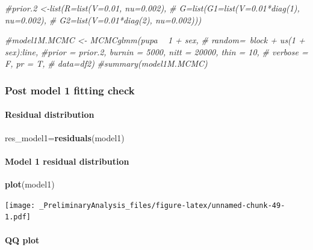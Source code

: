 \documentclass[
]{article}
\newenvironment{Shaded}{\begin{snugshade}}{\end{snugshade}}
\newcommand{\CommentTok}[1]{\textcolor[rgb]{0.56,0.35,0.01}{\textit{#1}}}
\newcommand{\KeywordTok}[1]{\textcolor[rgb]{0.13,0.29,0.53}{\textbf{#1}}}
\newcommand{\NormalTok}[1]{#1}
\begin{document}
\begin{Shaded}
\begin{Highlighting}[]
\CommentTok{#prior.2 <-list(R=list(V=0.01, nu=0.002), }
 \CommentTok{#              G=list(G1=list(V=0.01*diag(1), nu=0.002),}
  \CommentTok{#                    G2=list(V=0.01*diag(2), nu=0.002)))}

\CommentTok{#model1M.MCMC <- MCMCglmm(pupa ~ 1 + sex, }
 \CommentTok{# random=~block + us(1 + sex):line,}
  \CommentTok{#prior = prior.2, burnin = 5000, nitt = 20000, thin = 10,}
\CommentTok{# verbose = F, pr = T,}
 \CommentTok{# data=df2)}
\CommentTok{#summary(model1M.MCMC)}
\end{Highlighting}
\end{Shaded}

\hypertarget{post-model-1-fitting-check-2}{%
\subsubsection{Post model 1 fitting
check}\label{post-model-1-fitting-check-2}}

\hypertarget{residual-distribution-2}{%
\paragraph{Residual distribution}\label{residual-distribution-2}}

\begin{Shaded}
\begin{Highlighting}[]
\NormalTok{res_model1=}\KeywordTok{residuals}\NormalTok{(model1)}
\end{Highlighting}
\end{Shaded}

\hypertarget{model-1-residual-distribution-2}{%
\paragraph{Model 1 residual
distribution}\label{model-1-residual-distribution-2}}

\begin{Shaded}
\begin{Highlighting}[]
\KeywordTok{plot}\NormalTok{(model1)}
\end{Highlighting}
\end{Shaded}

\texttt{[image: \_PreliminaryAnalysis\_files/figure-latex/unnamed-chunk-49-1.pdf]}

\hypertarget{qq-plot-2}{%
\paragraph{QQ plot}\label{qq-plot-2}}
\end{document}
